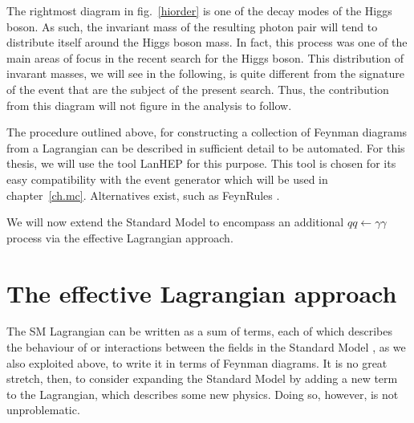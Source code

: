 The rightmost diagram in fig.~\ref{hiorder} is one of the decay modes of the Higgs boson. As such, the invariant mass of the resulting photon pair will tend to distribute itself around the Higgs boson mass. In fact, this process was one of the main areas of focus in the recent search for the Higgs boson. This distribution of invarant masses, we will see in the following, is quite different from the signature of the event that are the subject of the present search. Thus, the contribution from this diagram will not figure in the analysis to follow.

The procedure outlined above, for constructing a collection of Feynman diagrams from a Lagrangian can be described in sufficient detail to be automated. For this thesis, we will use the tool LanHEP \cite{lanhep} for this purpose. This tool is chosen for its easy compatibility with the event generator which will be used in chapter~\ref{ch.mc}. Alternatives exist, such as FeynRules \cite{feynrules}.

We will now extend the Standard Model to encompass an additional $qq\leftarrow\gamma\gamma$ process via the effective Lagrangian approach.

\section{The effective Lagrangian approach}

The SM Lagrangian can be written as a sum of terms, each of which describes the behaviour of or interactions between the fields in the Standard Model \cite{srednicki}, as we also exploited above, to write it in terms of Feynman diagrams. It is no great stretch, then, to consider expanding the Standard Model by adding a new term to the Lagrangian, which describes some new physics. Doing so, however, is not unproblematic.

